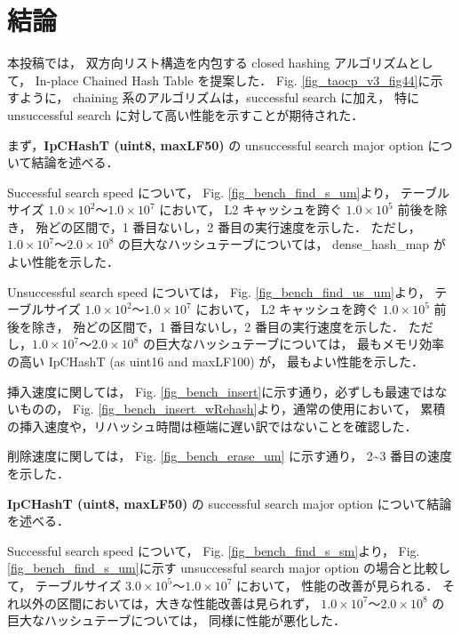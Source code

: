 \chapter{結論}
\label{chap_Conclusion}


本投稿では，
双方向リスト構造を内包する closed hashing アルゴリズムとして，
In-place Chained Hash Table を提案した．
Fig. \ref{fig_taocp_v3_fig44}に示すように，
chaining 系のアルゴリズムは，successful search に加え，
特に unsuccessful search に対して高い性能を示すことが期待された．
\newline

まず，{\bf IpCHashT (uint8, maxLF50)} の unsuccessful search major option について結論を述べる．

Successful search speed について，
Fig. \ref{fig_bench_find_s_um}より，
テーブルサイズ $1.0\times10^2〜1.0\times10^7$ において，
L2 キャッシュを跨ぐ $1.0\times10^5$ 前後を除き，
殆どの区間で，1 番目ないし，2 番目の実行速度を示した．
ただし，$1.0\times10^7〜2.0\times10^8$ の巨大なハッシュテーブについては，
dense\_hash\_map がよい性能を示した．

Unsuccessful search speed については，
Fig. \ref{fig_bench_find_us_um}より，
テーブルサイズ $1.0\times10^2〜1.0\times10^7$ において，
L2 キャッシュを跨ぐ $1.0\times10^5$ 前後を除き，
殆どの区間で，1 番目ないし，2 番目の実行速度を示した．
ただし，$1.0\times10^7〜2.0\times10^8$ の巨大なハッシュテーブについては，
最もメモリ効率の高い IpCHashT (as uint16 and maxLF100) が，
最もよい性能を示した．

挿入速度に関しては，
Fig. \ref{fig_bench_insert}に示す通り，必ずしも最速ではないものの，
Fig. \ref{fig_bench_insert_wRehash}より，通常の使用において，
累積の挿入速度や，リハッシュ時間は極端に遅い訳ではないことを確認した．

削除速度に関しては，
Fig. \ref{fig_bench_erase_um} に示す通り，
2\textasciitilde 3 番目の速度を示した．
\newline

{\bf IpCHashT (uint8, maxLF50)} の successful search major option について結論を述べる．

Successful search speed について，
Fig. \ref{fig_bench_find_s_sm}より，
Fig. \ref{fig_bench_find_s_um}に示す unsuccessful search major option の場合と比較して，
テーブルサイズ $3.0\times10^5〜1.0\times10^7$ において，
性能の改善が見られる．
それ以外の区間においては，大きな性能改善は見られず，
$1.0\times10^7〜2.0\times10^8$ の巨大なハッシュテーブについては，
同様に性能が悪化した．

